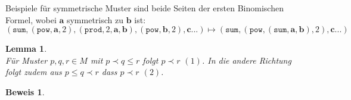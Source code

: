
Beispiele für symmetrische Muster sind beide Seiten der ersten Binomischen Formel, wobei $\mathbf a$ symmetrisch zu $\mathbf b$ ist:
$$(\texttt{sum}, (\texttt{pow}, \mathbf a, 2), (\texttt{prod}, 2, \mathbf a, \mathbf b), (\texttt{pow}, \mathbf b, 2), \mathbf {c...}) \mapsto (\texttt{sum}, (\texttt{pow}, (\texttt{sum}, \mathbf a, \mathbf b), 2), \mathbf {c...})$$


\newtheorem{lemTransitivStark}[bsp]{Lemma}
\begin{lemTransitivStark}~\\
Für Muster $p, q, r \in M$ mit $p \prec q \leq r$ folgt $p \prec r$ $(1)$. In die andere Richtung folgt zudem aus $p \leq q \prec r$ dass $p \prec r$ $(2)$.
\end{lemTransitivStark}

\newtheorem{bewTransitivStark}[bsp]{Beweis}
\begin{bewTransitivStark}~\\
\end{bewTransitivStark}
























